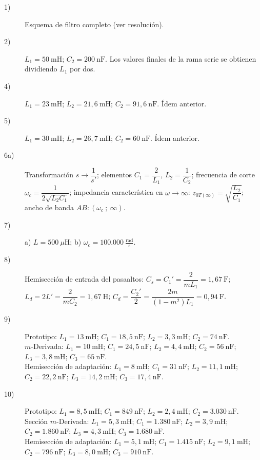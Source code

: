 \documentclass[class=article, crop=false, oneside]{standalone}
\begin{document}
\begin{description}
    \item[1)] Esquema de filtro completo (ver resolución).
    \item[2)] $L_1 = 50\ \text{mH}$; $C_2 = 200\ \text{nF}$. Los valores finales
    de la rama serie se obtienen dividiendo $L_1$ por dos.
    \item[4)] $L_1 = 23\ \text{mH}$; $L_2 = 21{,}6\ \text{mH}$;
    $C_2 = 91{,}6\ \text{nF}$. Ídem anterior.
    \item[5)] $L_1 = 30\ \text{mH}$; $L_2 = 26{,}7\ \text{mH}$;
    $C_2 = 60\ \text{nF}$. Ídem anterior.
    \item[6a)] Transformación $s\to\dfrac{1}{s'}$; elementos
    $C_1 = \dfrac{2}{L_1}$, $L_2 = \dfrac{1}{C_2}$; frecuencia de corte
    $\omega_c = \dfrac{1}{2\sqrt{L_2 C_1}}$; impedancia característica en
    $\omega\to\infty$: $z_{0T(\infty)} = \sqrt{\dfrac{L_2}{C_1}}$; ancho de
    banda $AB:(\omega_c\ ;\ \infty)$.
    \item[7)] a) $L = 500\ \mu\text{H}$; \qquad b) $\omega_c = 100.000\ \tfrac{\text{rad}}{\text{s}}$.
    \item[8)] Hemisección de entrada del pasaaltos:
    $C_s = C_1' = \dfrac{2}{m L_1} = 1{,}67\ \text{F}$;
    $L_d = 2L' = \dfrac{2}{m C_2} = 1{,}67\ \text{H}$;
    $C_d = \dfrac{C_2'}{2} = \dfrac{2m}{(1-m^2)L_1} = 0{,}94\ \text{F}$.
    \item[9)] Prototipo: $L_1 = 13\ \text{mH}$; $C_1 = 18{,}5\ \text{nF}$;
    $L_2 = 3{,}3\ \text{mH}$; $C_2 = 74\ \text{nF}$.\\
    $m$-Derivada: $L_1 = 10\ \text{mH}$; $C_1 = 24{,}5\ \text{nF}$;
    $L_2 = 4{,}4\ \text{mH}$; $C_2 = 56\ \text{nF}$; $L_3 = 3{,}8\ \text{mH}$;
    $C_3 = 65\ \text{nF}$.\\
    Hemisección de adaptación: $L_1 = 8\ \text{mH}$; $C_1 = 31\ \text{nF}$;
    $L_2 = 11{,}1\ \text{mH}$; $C_2 = 22{,}2\ \text{nF}$; $L_3 = 14{,}2\ \text{mH}$;
    $C_3 = 17{,}4\ \text{nF}$.
    \item[10)] Prototipo: $L_1 = 8{,}5\ \text{mH}$; $C_1 = 849\ \text{nF}$;
    $L_2 = 2{,}4\ \text{mH}$; $C_2 = 3.030\ \text{nF}$.\\
    Sección $m$-Derivada: $L_1 = 5{,}3\ \text{mH}$; $C_1 = 1.380\ \text{nF}$;
    $L_2 = 3{,}9\ \text{mH}$; $C_2 = 1.860\ \text{nF}$; $L_3 = 4{,}3\ \text{mH}$;
    $C_3 = 1.680\ \text{nF}$.\\
    Hemisección de adaptación: $L_1 = 5{,}1\ \text{mH}$; $C_1 = 1.415\ \text{nF}$;
    $L_2 = 9{,}1\ \text{mH}$; $C_2 = 796\ \text{nF}$; $L_3 = 8{,}0\ \text{mH}$;
    $C_3 = 910\ \text{nF}$.
\end{description}
\end{document}
